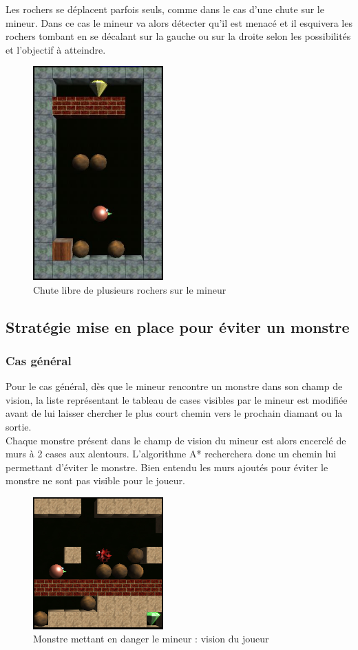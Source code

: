\documentclass[a4paper,11pt]{article}
\begin{document}
\newpage
Les rochers se d\'eplacent parfois seuls, comme dans le cas d'une chute sur le mineur. Dans ce cas le mineur va alors d\'etecter qu'il est menac\'e et il esquivera les rochers tombant en se d\'ecalant sur la gauche ou sur la droite selon les possibilit\'es et l'objectif \`a atteindre.

		\begin{figure}[h]
			\center
			\includegraphics[width=5cm]{rochers3}
			\caption{\label{deplacementRocher3} Chute libre de plusieurs rochers sur le mineur}
		\end{figure}
		\clearpage
		
	\newpage
	\subsection{Strat\'egie mise en place pour \'eviter un monstre}
	
		\subsubsection{Cas g\'en\'eral}
		
		Pour le cas g\'en\'eral, d\`es que le mineur rencontre un monstre dans son champ de vision, la liste repr\'esentant le tableau de cases visibles par le mineur est modifi\'ee avant de lui laisser chercher le plus court chemin vers le prochain diamant ou la sortie.\\
Chaque monstre pr\'esent dans le champ de vision du mineur est alors encercl\'e de murs \`a 2 cases aux alentours. L'algorithme A* recherchera donc un chemin lui permettant d'\'eviter le monstre. Bien entendu les murs ajout\'es pour \'eviter le monstre ne sont pas visible pour le joueur.

		\begin{figure}[h]
			\center
			\includegraphics[width=5cm]{monstre1}
			\caption{\label{monstre1} Monstre mettant en danger le mineur : vision du joueur}
		\end{figure}
		
\end{document}
